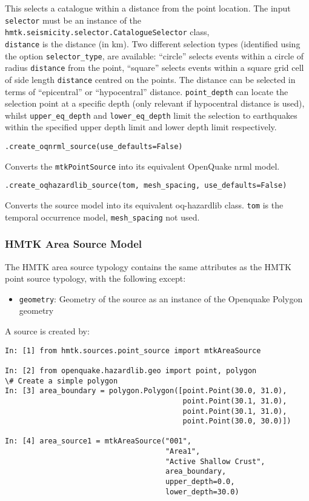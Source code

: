 This selects a catalogue within a distance from the point location. The input \verb=selector= must be an instance of the \verb=hmtk.seismicity.selector.CatalogueSelector= class, \\ \verb=distance= is the distance (in km). Two different selection types (identified using the option \verb=selector_type=, are available: ``circle'' selects events within a circle of radius \verb=distance= from the point, ``square'' selects events within a square grid cell of side length \verb=distance= centred on the points. The distance can be selected in terms of ``epicentral'' or ``hypocentral'' distance. \verb=point_depth= can locate the selection point at a specific depth (only relevant if hypocentral distance is used), whilst \verb=upper_eq_depth= and \verb=lower_eq_depth= limit the selection to earthquakes within the specified upper depth limit and lower depth limit respectively. 


\verb;.create_oqnrml_source(use_defaults=False);

Converts the \verb=mtkPointSource= into its equivalent OpenQuake nrml model.

\verb;.create_oqhazardlib_source(tom, mesh_spacing, use_defaults=False);

Converts the source model into its equivalent oq-hazardlib class. \verb=tom= is the temporal occurrence model, \verb=mesh_spacing= not used.

\subsubsection{HMTK Area Source Model}

The HMTK area source typology contains the same attributes as the HMTK point source typology, with the following except:

\begin{itemize}
\item \verb=geometry=: Geometry of the source as an instance of the Openquake Polygon geometry
\end{itemize}

A source is created by:

\begin{Verbatim}[frame=single, commandchars=\\\{\}, fontsize=\scriptsize, samepage=true]
In: [1] from hmtk.sources.point_source import mtkAreaSource

In: [2] from openquake.hazardlib.geo import point, polygon
\# Create a simple polygon
In: [3] area_boundary = polygon.Polygon([point.Point(30.0, 31.0),
                                         point.Point(30.1, 31.0),
                                         point.Point(30.1, 31.0),
                                         point.Point(30.0, 30.0)]) 

In: [4] area_source1 = mtkAreaSource("001",
                                     "Area1",
                                     "Active Shallow Crust",
                                     area_boundary,
                                     upper_depth=0.0,
                                     lower_depth=30.0)
\end{Verbatim}

